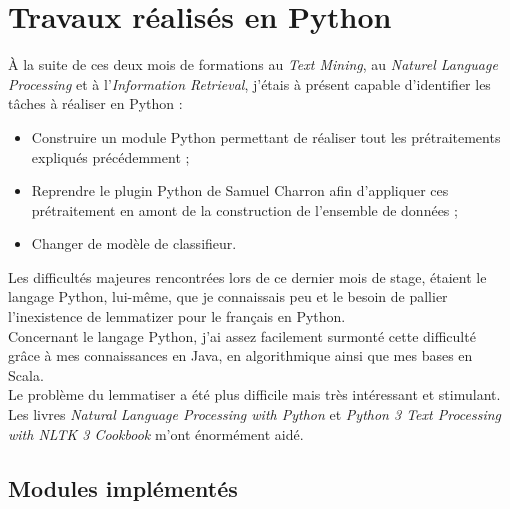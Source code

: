 \section{Travaux réalisés en Python}
\label{sec:travaux_python}
    À la suite de ces deux mois de formations au \textit{Text Mining}, au \textit{Naturel Language Processing} et à l'\textit{Information Retrieval}, j'étais à présent capable d'identifier les tâches à réaliser en Python :
    \begin{itemize}
        \item Construire un module Python permettant de réaliser tout les prétraitements expliqués précédemment ;
        \item Reprendre le plugin Python de Samuel Charron afin d'appliquer ces prétraitement en amont de la construction de l'ensemble de données ;
        \item Changer de modèle de classifieur.\\
    \end{itemize}

    Les difficultés majeures rencontrées lors de ce dernier mois de stage, étaient le langage Python, lui-même, que je connaissais peu et le besoin de pallier l'inexistence de lemmatizer pour le français en Python.\\
    Concernant le langage Python, j'ai assez facilement surmonté cette difficulté grâce à mes connaissances en Java, en algorithmique ainsi que mes bases en Scala.\\
    Le problème du lemmatiser a été plus difficile mais très intéressant et stimulant.\\
    Les livres \textit{Natural Language Processing with Python}\autocite{nlp_p} et \textit{Python 3 Text Processing with NLTK 3 Cookbook}\autocite{nltk} m'ont énormément aidé.

    \subsection{Modules implémentés}

